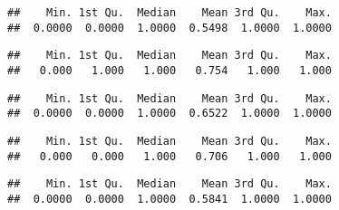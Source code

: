 \documentclass[11pt,]{article}
\newenvironment{Shaded}{\begin{snugshade}}{\end{snugshade}}
\newcommand{\KeywordTok}[1]{\textcolor[rgb]{0.13,0.29,0.53}{\textbf{#1}}}
\newcommand{\OperatorTok}[1]{\textcolor[rgb]{0.81,0.36,0.00}{\textbf{#1}}}
\newcommand{\NormalTok}[1]{#1}
\begin{document}
\begin{verbatim}
##    Min. 1st Qu.  Median    Mean 3rd Qu.    Max. 
##  0.0000  0.0000  1.0000  0.5498  1.0000  1.0000
\end{verbatim}

\begin{Shaded}
\end{Shaded}

\begin{verbatim}
##    Min. 1st Qu.  Median    Mean 3rd Qu.    Max. 
##   0.000   1.000   1.000   0.754   1.000   1.000
\end{verbatim}

\begin{Shaded}
\end{Shaded}

\begin{verbatim}
##    Min. 1st Qu.  Median    Mean 3rd Qu.    Max. 
##  0.0000  0.0000  1.0000  0.6522  1.0000  1.0000
\end{verbatim}

\begin{Shaded}
\end{Shaded}

\begin{verbatim}
##    Min. 1st Qu.  Median    Mean 3rd Qu.    Max. 
##   0.000   0.000   1.000   0.706   1.000   1.000
\end{verbatim}

\begin{Shaded}
\end{Shaded}

\begin{verbatim}
##    Min. 1st Qu.  Median    Mean 3rd Qu.    Max. 
##  0.0000  0.0000  1.0000  0.5841  1.0000  1.0000
\end{verbatim}
\end{document}
